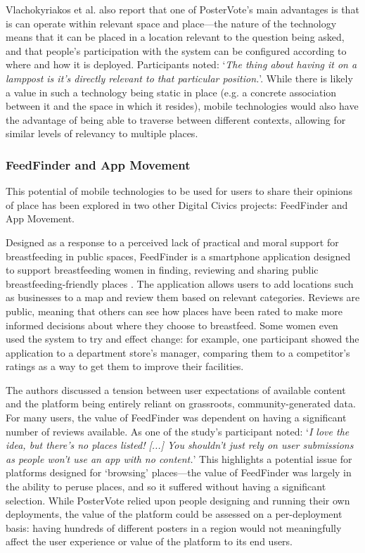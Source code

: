 Vlachokyriakos et al. also report that one of PosterVote's main advantages is that is can operate within relevant space and place---the nature of the technology means that it can be placed in a location relevant to the question being asked, and that people's participation with the system can be configured according to where and how it is deployed. Participants noted: `\textit{The thing about having it on a lamppost is it's directly relevant to that particular position.}'. While there is likely a value in such a technology being static in place (e.g. a concrete association between it and the space in which it resides), mobile technologies would also have the advantage of being able to traverse between different contexts, allowing for similar levels of relevancy to multiple places. 

\subsubsection{FeedFinder and App Movement}

This potential of mobile technologies to be used for users to share their opinions of place has been explored in two other Digital Civics projects: FeedFinder and App Movement. 

Designed as a response to a perceived lack of practical and moral support for breastfeeding in public spaces, FeedFinder is a smartphone application designed to support breastfeeding women in finding, reviewing and sharing public breastfeeding-friendly places \citep{Balaam2015}. The application allows users to add locations such as businesses to a map and review them based on relevant categories. Reviews are public, meaning that others can see how places have been rated to make more informed decisions about where they choose to breastfeed. Some women even used the system to try and effect change: for example, one participant showed the application to a department store's manager, comparing them to a competitor's ratings as a way to get them to improve their facilities. 

The authors discussed a tension between user expectations of available content and the platform being entirely reliant on grassroots, community-generated data. For many users, the value of FeedFinder was dependent on having a significant number of reviews available. As one of the study's participant noted: `\textit{I love the idea, but there's no places listed! [...] You shouldn't just rely on user submissions as people won't use an app with no content.}' This highlights a potential issue for platforms designed for `browsing' places---the value of FeedFinder was largely in the ability to peruse places, and so it suffered without having a significant selection. While PosterVote relied upon people designing and running their own deployments, the value of the platform could be assessed on a per-deployment basis: having hundreds of different posters in a region would not meaningfully affect the user experience or value of the platform to its end users. 

